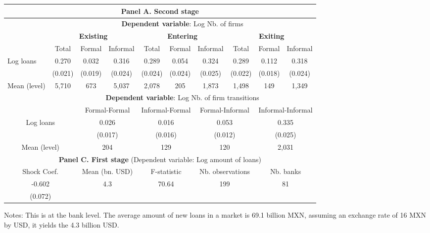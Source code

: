 \centering
\begin{threeparttable}
\begin{tabular}{lccccccccc}
\toprule
\multicolumn{10}{c}{\textbf{Panel A. Second stage}} \\
\midrule
& \multicolumn{9}{c}{\textbf{Dependent variable}: Log Nb. of firms} \\
\cmidrule(lr){2-10}
 & \multicolumn{3}{c}{\textbf{Existing}} & \multicolumn{3}{c}{\textbf{Entering}} & \multicolumn{3}{c}{\textbf{Exiting}} \\
\cmidrule(lr){2-10}
& Total 
& Formal 
& \multicolumn{1}{c}{Informal}
& Total 
& Formal 
& \multicolumn{1}{c}{Informal}
& Total 
& Formal 
& Informal \\
\midrule
Log loans 
&  0.270  & 0.032  & 0.316   &  0.289  & 0.054   & 0.324  & 0.289   & 0.112   & 0.318 \\
& (0.021) & (0.019) & (0.024) & (0.024) & (0.024) & (0.025) & (0.022) & (0.018) & (0.024) \\
\midrule
Mean (level) & 5,710 & 673 & 5,037 & 2,078 & 205 & 1,873 & 1,498 & 149 & 1,349\\
\midrule


& \multicolumn{9}{c}{\textbf{Dependent variable}: Log Nb. of firm transitions} \\
\cmidrule(lr){3-10}
\multicolumn{2}{c}{} & \multicolumn{2}{c}{Formal-Formal} & \multicolumn{2}{c}{Informal-Formal} & \multicolumn{2}{c}{Formal-Informal} & \multicolumn{2}{c}{Informal-Informal} \\
\midrule 
\multicolumn{2}{c}{Log loans} & \multicolumn{2}{c}{0.026} & \multicolumn{2}{c}{0.016} & \multicolumn{2}{c}{0.053} & \multicolumn{2}{c}{0.335} \\
\multicolumn{2}{c}{} & \multicolumn{2}{c}{(0.017)} & \multicolumn{2}{c}{(0.016)} & \multicolumn{2}{c}{(0.012)} & \multicolumn{2}{c}{(0.025)} \\
\midrule
\multicolumn{2}{c}{Mean (level)} & \multicolumn{2}{c}{204} & \multicolumn{2}{c}{129} & \multicolumn{2}{c}{120} & \multicolumn{2}{c}{2,031} \\
\midrule

\multicolumn{10}{c}{\textbf{Panel C. First stage} (Dependent variable: Log amount of loans)} \\
\midrule
\multicolumn{2}{c}{Shock Coef.} & \multicolumn{2}{c}{Mean (bn. USD)} &  \multicolumn{2}{c}{F-statistic} &  \multicolumn{2}{c}{Nb. observations} & \multicolumn{2}{c}{Nb. banks} \\
\midrule
\multicolumn{2}{c}{-0.602} &  \multicolumn{2}{c}{\multirow{2}{*}{4.3}} &  \multicolumn{2}{c}{\multirow{2}{*}{70.64}} & \multicolumn{2}{c}{\multirow{2}{*}{199}} & \multicolumn{2}{c}{\multirow{2}{*}{81}} \\
\multicolumn{2}{c}{(0.072)} &  &  &  &  \\

\bottomrule
\end{tabular}
\begin{tablenotes}[flushleft]
\tiny
\item Notes: This is at the bank level. The average amount of new loans in a market is 69.1 billion MXN, assuming an exchange rate of 16 MXN by USD, it yields the 4.3 billion USD.
\end{tablenotes}
\end{threeparttable}
